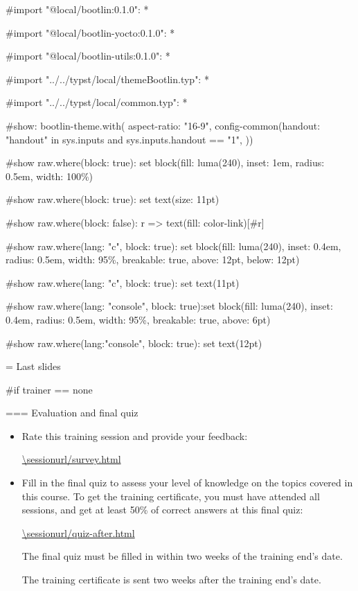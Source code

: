 #import "@local/bootlin:0.1.0": *

#import "@local/bootlin-yocto:0.1.0": *

#import "@local/bootlin-utils:0.1.0": *

#import "../../typst/local/themeBootlin.typ": *

#import "../../typst/local/common.typ": *

#show: bootlin-theme.with( aspect-ratio: "16-9", config-common(handout: "handout" in sys.inputs and sys.inputs.handout == "1", ))

#show raw.where(block: true): set block(fill: luma(240), inset: 1em, radius: 0.5em, width: 100\%)

#show raw.where(block: true): set text(size: 11pt)

#show raw.where(block: false): r => text(fill: color-link)[#r]

#show raw.where(lang: "c", block: true): set block(fill: luma(240), inset: 0.4em, radius: 0.5em, width: 95\%, breakable: true, above: 12pt, below: 12pt)

#show raw.where(lang: "c", block: true): set text(11pt)

#show raw.where(lang: "console", block: true):set block(fill: luma(240), inset: 0.4em, radius: 0.5em, width: 95\%, breakable: true, above: 6pt)

#show raw.where(lang:"console", block: true): set text(12pt)

 = Last slides


#if trainer == none{
=== Evaluation and final quiz

  \begin{itemize}

  \item Rate this training session and provide your feedback:

    {\small \url{\sessionurl/survey.html}}

  \item Fill in the final quiz to assess your level of knowledge on
    the topics covered in this course. To get the training
    certificate, you must have attended all sessions, and get at least
    50\% of correct answers at this final quiz:

    {\small \url{\sessionurl/quiz-after.html}}

    The final quiz must be filled in within two weeks of the training
    end's date.

    The training certificate is sent two weeks after the training
    end's date.

  \end{itemize}


}

